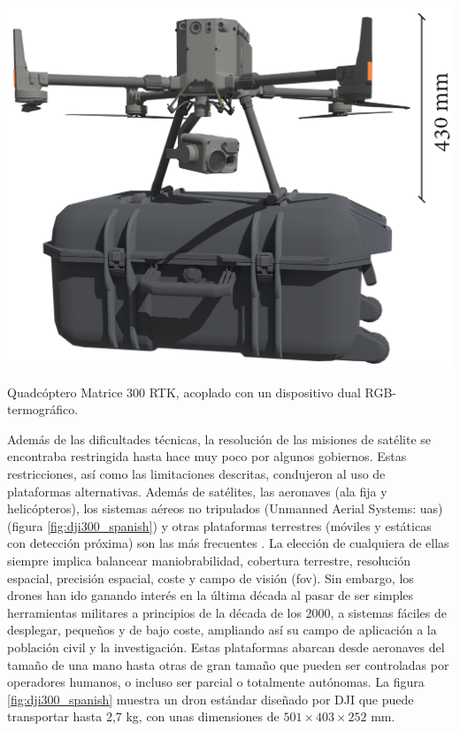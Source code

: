 \begin{marginfigure}[.7cm]
	\includegraphics{figs/introduction/dji300.png}
	\caption{Quadcóptero Matrice 300 RTK, acoplado con un dispositivo dual RGB-termográfico. }
	\label{fig:dji300_spanish}
\end{marginfigure}
Además de las dificultades técnicas, la resolución de las misiones de satélite se encontraba restringida hasta hace muy poco por algunos gobiernos. Estas restricciones, así como las limitaciones descritas, condujeron al uso de plataformas alternativas. Además de satélites, las aeronaves (ala fija y helicópteros), los sistemas aéreos no tripulados (Unmanned Aerial Systems: \acrshort{uas}) (figura \ref{fig:dji300_spanish}) y otras plataformas terrestres (móviles y estáticas con detección próxima) son las más frecuentes \cite{lillesand_remote_2015}. La elección de cualquiera de ellas siempre implica balancear maniobrabilidad, cobertura terrestre, resolución espacial, precisión espacial, coste y campo de visión (\acrshort{fov}). Sin embargo, los drones han ido ganando interés en la última década al pasar de ser simples herramientas militares a principios de la década de los 2000, a sistemas fáciles de desplegar, pequeños y de bajo coste, ampliando así su campo de aplicación a la población civil y la investigación. Estas plataformas abarcan desde aeronaves del tamaño de una mano hasta otras de gran tamaño que pueden ser controladas por operadores humanos, o incluso ser parcial o totalmente autónomas. La figura \ref{fig:dji300_spanish} muestra un dron estándar diseñado por DJI que puede transportar hasta 2,7 \si{\kilo\gram}, con unas dimensiones de $501 \times 403 \times 252$ \si{\milli\meter}.

